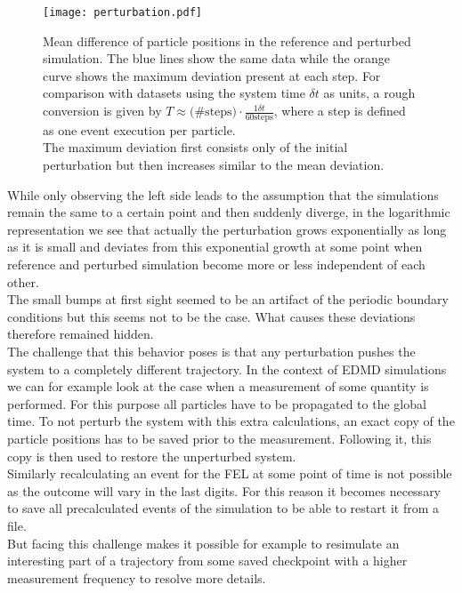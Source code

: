 \begin{figure}[h]
\centering
\texttt{[image: perturbation.pdf]}
\caption[Exponential growth of perturbations in chaotic system]{Mean difference of particle positions in the reference and perturbed simulation. The blue lines show the same data while the orange curve shows the maximum deviation present at each step. For comparison with datasets using the system time $\delta t$ as units, a rough conversion is given by $T \approx \text{(\#steps)} \cdot \frac{1 \delta t}{60 \text{steps}}$, where a step is defined as one event execution per particle.\\ The maximum deviation first consists only of the initial perturbation but then increases similar to the mean deviation.}
\label{fig:chaotic_behavior}
\end{figure}

While only observing the left side leads to the assumption that the simulations remain the same to a certain point and then suddenly diverge, in the logarithmic representation we see that actually the perturbation grows exponentially as long as it is small and deviates from this exponential growth at some point when reference and perturbed simulation become more or less independent of each other.\\
The small bumps at first sight seemed to be an artifact of the periodic boundary conditions but this seems not to be the case. What causes these deviations therefore remained hidden.\\

The challenge that this behavior poses is that any perturbation pushes the system to a completely different trajectory. In the context of EDMD simulations we can for example look at the case when a measurement of some quantity is performed. For this purpose all particles have to be propagated to the global time. To not perturb the system with this extra calculations, an exact copy of the particle positions has to be saved prior to the measurement. Following it, this copy is then used to restore the unperturbed system.\\ 
Similarly recalculating an event for the FEL at some point of time is not possible as the outcome will vary in the last digits. For this reason it becomes necessary to save all precalculated events of the simulation to be able to restart it from a file.\\
But facing this challenge makes it possible for example to resimulate an interesting part of a trajectory from some saved checkpoint with a higher measurement frequency to resolve more details. 

